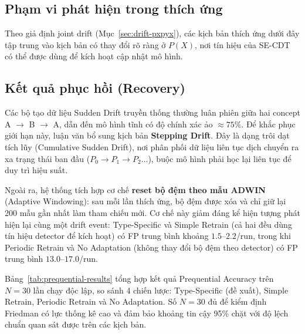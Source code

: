 \subsection{Phạm vi phát hiện trong thích ứng}
Theo giả định joint drift (Mục~\ref{sec:drift-pxpyx}), các kịch bản thích ứng dưới đây tập trung vào kịch bản có thay đổi rõ ràng ở $P(X)$, nơi tín hiệu của SE-CDT có thể được dùng để kích hoạt cập nhật mô hình.

\subsection{Kết quả phục hồi (Recovery)}

Các bộ tạo dữ liệu Sudden Drift truyền thống thường luân phiên giữa hai concept A $\to$ B $\to$ A, dẫn đến mô hình tĩnh có độ chính xác ảo $\approx 75\%$. Để khắc phục giới hạn này, luận văn bổ sung kịch bản \textbf{Stepping Drift}. Đây là dạng trôi dạt tích lũy (Cumulative Sudden Drift), nơi phân phối dữ liệu liên tục dịch chuyển ra xa trạng thái ban đầu ($P_0 \to P_1 \to P_2 \dots$), buộc mô hình phải học lại liên tục để duy trì hiệu suất.

Ngoài ra, hệ thống tích hợp cơ chế \textbf{reset bộ đệm theo mẫu ADWIN} (Adaptive Windowing): sau mỗi lần thích ứng, bộ đệm được xóa và chỉ giữ lại 200 mẫu gần nhất làm tham chiếu mới. Cơ chế này giảm đáng kể hiện tượng phát hiện lại cùng một drift event: Type-Specific và Simple Retrain (cả hai đều dùng tín hiệu detector để kích hoạt) có FP trung bình khoảng $1.5$--$2.2$/run, trong khi Periodic Retrain và No Adaptation (không thay đổi bộ đệm theo detector) có FP trung bình $13.0$--$17.0$/run.

Bảng~\ref{tab:prequential-results} tổng hợp kết quả Prequential Accuracy trên $N = 30$ lần chạy độc lập, so sánh 4 chiến lược: Type-Specific (đề xuất), Simple Retrain, Periodic Retrain và No Adaptation. Số $N = 30$ đủ để kiểm định Friedman có lực thống kê cao và đảm bảo khoảng tin cậy 95\% chặt với độ lệch chuẩn quan sát được trên các kịch bản.


